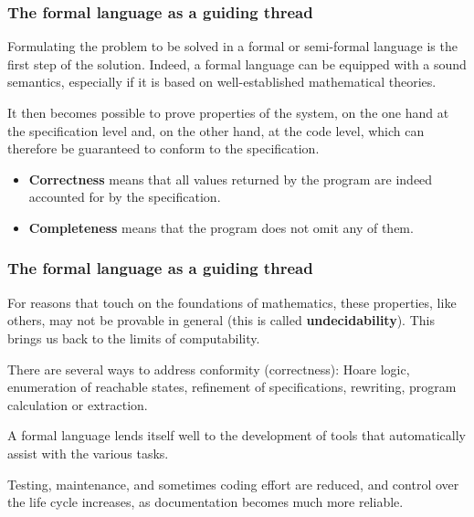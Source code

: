\documentclass[compress,dvipdfmx]{beamer}
\begin{document}
%
\begin{frame}
\frametitle{The formal language as a guiding thread}

  Formulating the problem to be solved in a formal or semi-formal
  language is the first step of the solution. Indeed, a formal
  language can be equipped with a sound semantics, especially if it is
  based on well\hyp{}established mathematical theories.

  \bigskip

  It then becomes possible to prove properties of the system,
  on the one hand at the specification level and, on the other hand,
  at the code level, which can therefore be guaranteed to conform to
  the specification.

  \medskip

  \begin{itemize}

    \item \textbf{Correctness} means that all values returned by the
      program are indeed accounted for by the specification.

      \item \textbf{Completeness} means that the program does not omit
        any of them.

  \end{itemize}

\end{frame}

%
\begin{frame}
\frametitle{The formal language as a guiding thread}

  For reasons that touch on the foundations of mathematics, these
  properties, like others, may not be provable in general (this is
  called \textbf{undecidability}). This brings us back to the limits
  of computability.

  \bigskip

  There are several ways to address conformity (correctness): Hoare
  logic, enumeration of reachable states, refinement of
  specifications, rewriting, program calculation or extraction.

  \bigskip

  A formal language lends itself well to the development of tools that
  automatically assist with the various tasks.

  \bigskip

  Testing, maintenance, and sometimes coding effort are
  reduced, and control over the life cycle increases, as
  documentation becomes much more reliable.

\end{frame}
\end{document}
